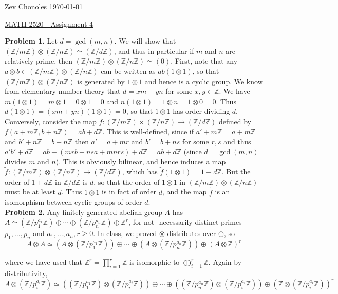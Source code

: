 \documentclass[11pt]{article}
\newcommand{\num}[1]{\noindent \textbf{#1}}
\newcommand{\Z}{\mathbb{Z}}
\theoremstyle{definition}
\begin{document}
\noindent Zev Chonoles \hfill \today\\[-0.4in]
\begin{center}
\noindent \underline{MATH 2520 - Assignment 4}
\end{center}

\num{Problem 1.} Let $d=\gcd(m,n)$. We will show that
$(\Z/m\Z)\otimes(\Z/n\Z)\simeq(\Z/d\Z)$, and thus in particular if $m$ and $n$
are relatively prime, then $(\Z/m\Z)\otimes(\Z/n\Z)\simeq(0)$. First, note that
any $a\otimes b\in(\Z/m\Z)\otimes(\Z/n\Z)$ can be written as $ab(1\otimes 1)$,
so that $(\Z/m\Z)\otimes(\Z/n\Z)$ is generated by $1\otimes 1$ and hence
is a cyclic group. We know from elementary number theory that $d=xm+yn$
for some $x,y\in\Z$. We have $m(1\otimes 1)=m\otimes 1=0\otimes 1=0$ and
$n(1\otimes 1)=1\otimes n=1\otimes0=0$. Thus $d(1\otimes 1)=(xm+yn)(1\otimes
1)=0$, so that $1\otimes1$ has order dividing $d$.\\

\noindent Conversely, consider the map
$f:(\Z/m\Z)\times(\Z/n\Z)\rightarrow(\Z/d\Z)$ defined by
$f(a+m\Z,b+n\Z)=ab+d\Z$. This is well-defined, since if $a'+m\Z=a+m\Z$
and $b'+n\Z=b+n\Z$ then $a'=a+mr$ and $b'=b+ns$ for some $r,s$ and
thus $a'b'+d\Z=ab+(mrb+nsa+mnrs)+d\Z=ab+d\Z$ (since $d=\gcd(m,n)$
divides $m$ and $n$). This is obviously bilinear, and hence induces a map
$\tilde{f}:(\Z/m\Z)\otimes(\Z/n\Z)\rightarrow(\mathbb{Z}/d\mathbb{Z})$, which
has $\tilde{f}(1\otimes1)=1+d\mathbb{Z}$. But the order of $1+d\mathbb{Z}$
in $\mathbb{Z}/d\mathbb{Z}$ is $d$, so that the order of $1\otimes1$ in
$(\Z/m\Z)\otimes(\Z/n\Z)$ must be at least $d$. Thus $1\otimes1$ is in fact
of order $d$, and the map $\tilde{f}$ is an isomorphism between cyclic groups
of order $d$. \\

\num{Problem 2.} Any finitely generated abelian group $A$ has $A\simeq
(\mathbb{Z}/p_1^{a_1}\mathbb{Z})\oplus\cdots\oplus(\mathbb{Z}/p_n^{a_n}\mathbb{Z})\oplus\mathbb{Z}^r$,
for not- necessarily-distinct primes $p_1,\ldots,p_n$ and
$a_1,\ldots,a_n,r\geq0$. In class, we proved $\otimes$ distributes over
$\oplus$, so
\[A\otimes
A\simeq(A\otimes(\Z/p_1^{a_1}\Z))\oplus\cdots\oplus(A\otimes(\Z/p_n^{a_n}\Z))\oplus(A\otimes\Z)^r\]


\noindent where we have used that $\mathbb{Z}^r=\prod_{i=1}^r\mathbb{Z}$
is isomorphic to $\bigoplus_{i=1}^r\mathbb{Z}$. Again by distributivity,
\[A\otimes(\Z/p_i^{a_i}\Z)\simeq
((\mathbb{Z}/p_1^{a_1}\mathbb{Z})\otimes(\mathbb{Z}/p_i^{a_i}\mathbb{Z}))\oplus\cdots\oplus((\mathbb{Z}/p_n^{a_n}\mathbb{Z})\otimes(\mathbb{Z}/p_i^{a_i}\mathbb{Z}))\oplus(\mathbb{Z}\otimes(\mathbb{Z}/p_i^{a_i}\mathbb{Z}))^r\]
\end{document}
